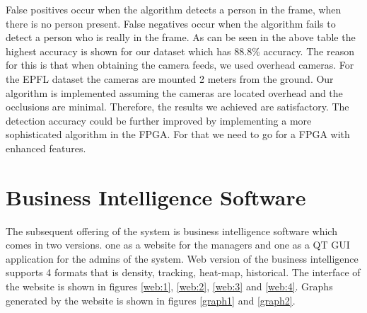\documentclass[12pt,a4paper]{report}
\begin{document}
False positives occur when the algorithm detects a person in the frame, when there is no person present. False negatives occur when the algorithm fails to detect a person who is really in the frame. 
As can be seen in the above table the highest accuracy is shown for our dataset which has 88.8\% accuracy. The reason for this is that when obtaining the camera feeds, we used overhead cameras. For the EPFL dataset the cameras are mounted 2 meters from the ground. Our algorithm is implemented assuming the cameras are located overhead and the occlusions are minimal. Therefore, the results we achieved are satisfactory. 
The detection accuracy could be further improved by implementing a more sophisticated algorithm in the FPGA. For that we need to go for a FPGA with enhanced features.


\section{Business Intelligence Software}
The subsequent offering of the system is business intelligence software which comes in two versions.  one as a website for the managers and one as a QT GUI application for the admins of the system. 
Web version of the business intelligence supports 4 formats that is density, tracking, heat-map, historical. The interface of the website is shown in figures \ref{web:1}, \ref{web:2}, \ref{web:3} and \ref{web:4}. Graphs generated by the website is shown in figures \ref{graph1} and \ref{graph2}.
\end{document}
